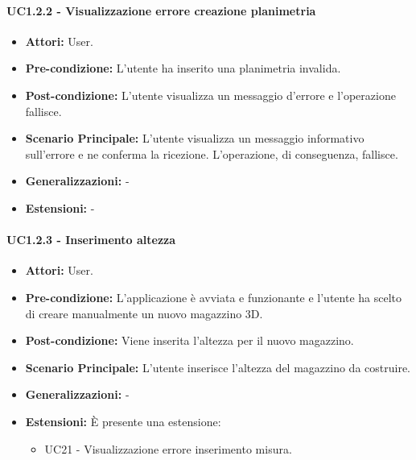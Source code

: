 \paragraph{UC1.2.2 - Visualizzazione errore creazione planimetria}
\begin{itemize}
    \item \textbf{Attori:} User.
    \item \textbf{Pre-condizione:}  L'utente ha inserito una planimetria invalida.
    \item \textbf{Post-condizione:} L'utente visualizza un messaggio d'errore e l'operazione fallisce.
    \item \textbf{Scenario Principale:} L'utente visualizza un messaggio informativo sull'errore e ne conferma la ricezione. L'operazione, di conseguenza, fallisce.
    \item \textbf{Generalizzazioni:} -
    \item \textbf{Estensioni:} -
\end{itemize}


\paragraph{UC1.2.3 - Inserimento altezza}
\begin{itemize}
    \item \textbf{Attori:} User.
    \item \textbf{Pre-condizione:}  L'applicazione è avviata e funzionante e l'utente ha scelto di creare manualmente un nuovo magazzino 3D.
    \item \textbf{Post-condizione:} Viene inserita l'altezza per il nuovo magazzino.
    \item \textbf{Scenario Principale:}  L’utente inserisce l'altezza del magazzino da costruire.
    \item \textbf{Generalizzazioni:} -
    \item \textbf{Estensioni:} È presente una estensione:
    \begin{itemize}
        \item UC21 - Visualizzazione errore inserimento misura.
    \end{itemize}
\end{itemize}


